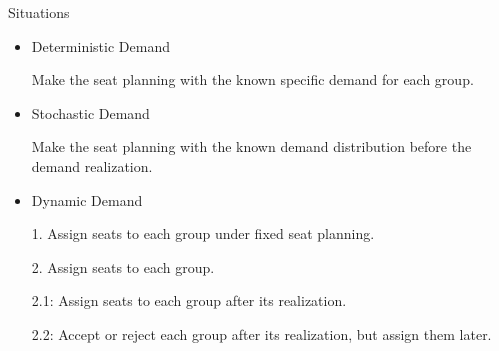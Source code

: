     \begin{frame}{Situations}
      \begin{itemize}
        \item Deterministic Demand
        
        Make the seat planning with the known specific demand for each group.
        \item Stochastic Demand
        
        Make the seat planning with the known demand distribution before the demand realization.
            
        \item Dynamic Demand

        1. Assign seats to each group under fixed seat planning.

        2. Assign seats to each group.
        
        2.1: Assign seats to each group after its realization.
    
        2.2: Accept or reject each group after its realization, but assign them later.
    
      \end{itemize}
    \end{frame}